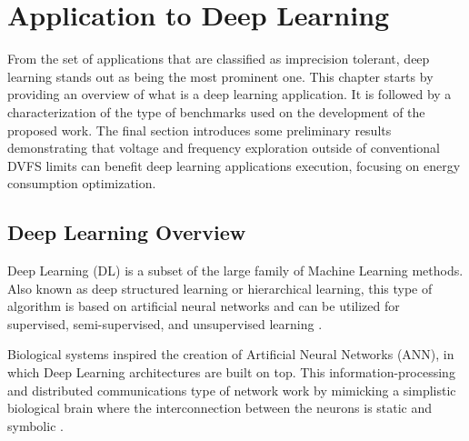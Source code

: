 


\chapter{Application to Deep Learning}
\label{chapter:application}

From the set of applications that are classified as imprecision tolerant, deep learning stands out as being the most prominent one. This chapter starts by providing an overview of what is a deep learning application. It is followed by a characterization of the type of benchmarks used on the development of the proposed work. The final section introduces some preliminary results demonstrating that voltage and frequency exploration outside of conventional DVFS limits can benefit deep learning applications execution, focusing on energy consumption optimization.

\section{Deep Learning Overview}
\label{sec:DLO}
Deep Learning (DL) is a subset of the large family of Machine Learning methods. Also known as deep structured learning or hierarchical learning, this type of algorithm is based on artificial neural networks and can be utilized for supervised, semi-supervised, and unsupervised learning \cite{bengio_representation_2013} \cite{schmidhuber_deep_2015}.

Biological systems inspired the creation of Artificial Neural Networks (ANN), in which Deep Learning architectures are built on top. This information-processing and distributed communications type of network work by mimicking a simplistic biological brain where the interconnection between the neurons is static and symbolic \cite{marblestone_toward_2016}. 

